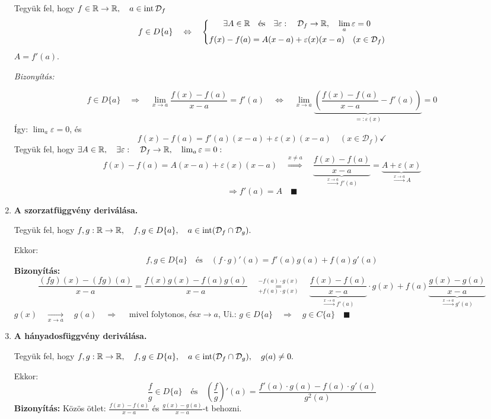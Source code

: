 \documentclass[a4paper,11.5pt]{article}
\DeclareMathOperator{\Int}{int}
\begin{document}
\begin{enumerate}
		Tegyük fel, hogy $f\in\R\to\R,\quad a\in\Int\mathcal{D}_f$
		\[ f\in D\{a\}\quad \Leftrightarrow\quad 
		\left\{\begin{gathered}
		\exists A\in\mathbb{R}\quad \text{és}\quad \exists \varepsilon:\quad \mathcal{D}_f\to\mathbb{R},\quad \lim_a\varepsilon=0\\
		f(x)-f(a)=A(x-a)+\varepsilon(x)(x-a)\quad (x\in\mathcal{D}_f)
		\end{gathered}\right. \]
		$A=f'(a)$.
		\medskip
		
		\textit{Bizonyítás:}
		
		\fbox{$\Rightarrow$}
		\[ f\in D\{a\}\quad \Rightarrow\quad \lim_{x\to a}\frac{f(x)-f(a)}{x-a}=f'(a)\quad \Leftrightarrow\quad \lim_{x\to a}\underbrace{\left(\frac{f(x)-f(a)}{x-a}-f'(a)\right)}_{=:\varepsilon(x)}=0 \]
		Így: \quad $\lim_a\varepsilon=0$, és 
		\[f(x)-f(a)=f'(a)(x-a)+\varepsilon(x)(x-a)\quad (x\in\mathcal{D}_f)\checkmark  \]
		\fbox{$\Leftarrow$} Tegyük fel, hogy $\exists A\in\mathbb{R},\quad \exists \varepsilon:\quad \mathcal{D}_f\to\mathbb{R},\quad \lim_a\varepsilon=0:$
		\[ f(x)-f(a)=A(x-a)+\varepsilon(x)(x-a)\quad \overset{x\not=a}{\Rightarrow}\quad \underbrace{\frac{f(x)-f(a)}{x-a}}_{\overset{x\to a}{\longrightarrow}f'(a)}=\underbrace{A+\varepsilon(x)}_{\overset{x\to a}{\longrightarrow}A} \]
		\[ \Rightarrow f'(a)=A\quad \blacksquare \]
		\item \textbf{A szorzatfüggvény deriválása.}
		
		Tegyük fel, hogy $f,g:\R\to\R, \quad f,g\in D\{a\},\quad a\in \Int(\mathcal{D}_f\cap\mathcal{D}_g).$
		
		Ekkor:
		\[f,g\in D\{a\}\quad \text{és}\quad (f\cdot g)'(a)=f'(a)g(a)+f(a)g'(a)\]
		\textbf{Bizonyítás:} 
		\[ \frac{(fg)(x)-(fg)(a)}{x-a}=\frac{f(x)g(x)-f(a)g(a)}{x-a}\quad \overset{-f(a)\cdot g(x)}{\underset{+f(a)\cdot g(x)}{=}}\quad \underbrace{\frac{f(x)-f(a)}{x-a}}_{\overset{x\to a}{\longrightarrow}f'(a)}\cdot g(x)+f(a)\underbrace{\frac{g(x)-g(a)}{x-a}}_{\overset{x\to a}{\longrightarrow}g'(a)} \]
		$g(x)\quad \underset{x\to a}{\longrightarrow}\quad g(a)\quad \Rightarrow\quad $ mivel folytonos, és\quad  $x\to a$, Ui.: $g\in D\{a\}\quad \Rightarrow\quad  g\in C\{a\}\quad \blacksquare$
		
		\item \textbf{A hányadosfüggvény deriválása.}
		
		Tegyük fel, hogy $f,g:\R\to\R, \quad f,g\in D\{a\}, \quad a\in \Int(\mathcal{D}_f\cap\mathcal{D}_g),\quad g(a)\not=0.$
		
		Ekkor:
		\[ \frac{f}{g}\in D\{a\}\quad \text{és}\quad \left(\frac{f}{g}\right)'(a)=\frac{f'(a)\cdot g(a)-f(a)\cdot g'(a)}{g^2(a)} \]
		\textbf{Bizonyítás:} Közös ötlet: $\displaystyle \frac{f(x)-f(a)}{x-a}$ és $\displaystyle \frac{g(x)-g(a)}{x-a}$-t behozni.
		

\end{enumerate}
\end{document}
